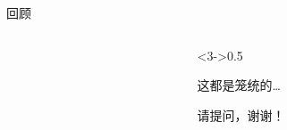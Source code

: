 \begin{frame}{回顾}
  \begin{columns}
    \begin{column}{0.5\textwidth}
      \tableofcontents[pausesections]
    \end{column}
    \pause
    \begin{column}<3->{0.5\textwidth}
      \begin{block}{}
        \begin{center}
        \large 这都是笼统的\dots

        \huge \alert{请提问，谢谢！}
        \end{center}
      \end{block}
    \end{column}
  \end{columns}
\end{frame}


